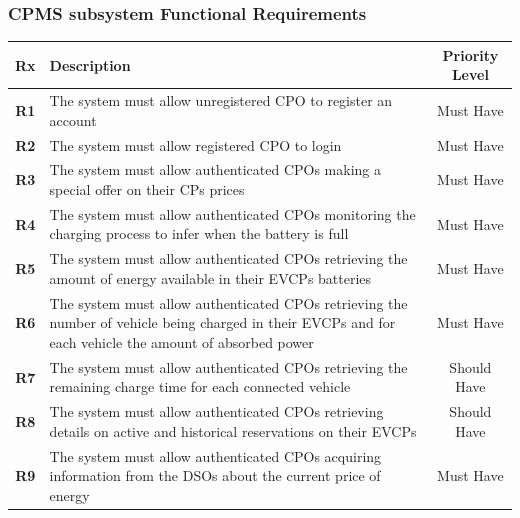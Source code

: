 \subsubsection{CPMS subsystem Functional Requirements}
\begin{table}[H]
    \begin{tabularx}{\textwidth}{cXc}
        \textbf{Rx}  & Description                                                                                                                                              & Priority Level \\
        \toprule
        \textbf{R1}  & The system must allow unregistered CPO to register an account                                                                                            & Must Have      \\
        \textbf{R2}  & The system must allow registered CPO to login                                                                                                            & Must Have      \\
        \textbf{R3}  & The system must allow authenticated CPOs making a special offer on their CPs prices                                                                      & Must Have      \\
        \textbf{R4}  & The system must allow authenticated CPOs monitoring the charging process to infer when the battery is full                                               & Must Have      \\
        \textbf{R5}  & The system must allow authenticated CPOs retrieving the amount of energy available in their EVCPs batteries                                              & Must Have      \\
        \textbf{R6}  & The system must allow authenticated CPOs retrieving the number of vehicle being charged in their EVCPs and for each vehicle the amount of absorbed power & Must Have      \\
        \textbf{R7}  & The system must allow authenticated CPOs retrieving the remaining charge time for each connected vehicle                                                 & Should Have    \\
        \textbf{R8}  & The system must allow authenticated CPOs retrieving details on active and historical reservations on their EVCPs                                         & Should Have    \\
        \textbf{R9}  & The system must allow authenticated CPOs acquiring information from the DSOs about the current price of energy                                           & Must Have      \\

\end{tabularx}
\end{table}
